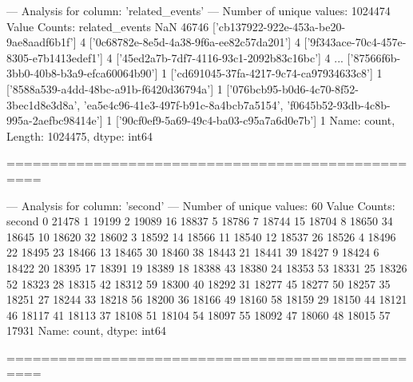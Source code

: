 --- Analysis for column: 'related_events' ---
Number of unique values: 1024474
Value Counts:
related_events
NaN                                                                                                                         46746
['cb137922-922e-453a-be20-9ae8aadf6b1f']                                                                                        4
['0c68782e-8e5d-4a38-9f6a-ee82c57da201']                                                                                        4
['9f343ace-70c4-457e-8305-e7b1413edef1']                                                                                        4
['45ed2a7b-7df7-4116-93c1-2092b83c16bc']                                                                                        4
                                                                                                                            ...  
['87566f6b-3bb0-40b8-b3a9-efca60064b90']                                                                                        1
['cd691045-37fa-4217-9c74-ca97934633c8']                                                                                        1
['8588a539-a4dd-48bc-a91b-f6420d36794a']                                                                                        1
['076bcb95-b0d6-4c70-8f52-3bec1d8e3d8a', 'ea5e4c96-41e3-497f-b91c-8a4bcb7a5154', 'f0645b52-93db-4c8b-995a-2aefbc98414e']        1
['90cf0ef9-5a69-49c4-ba03-c95a7a6d0e7b']                                                                                        1
Name: count, Length: 1024475, dtype: int64

==================================================

--- Analysis for column: 'second' ---
Number of unique values: 60
Value Counts:
second
0     21478
1     19199
2     19089
16    18837
5     18786
7     18744
15    18704
8     18650
34    18645
10    18620
32    18602
3     18592
14    18566
11    18540
12    18537
26    18526
4     18496
22    18495
23    18466
13    18465
30    18460
38    18443
21    18441
39    18427
9     18424
6     18422
20    18395
17    18391
19    18389
18    18388
43    18380
24    18353
53    18331
25    18326
52    18323
28    18315
42    18312
59    18300
40    18292
31    18277
45    18277
50    18257
35    18251
27    18244
33    18218
56    18200
36    18166
49    18160
58    18159
29    18150
44    18121
46    18117
41    18113
37    18108
51    18104
54    18097
55    18092
47    18060
48    18015
57    17931
Name: count, dtype: int64

==================================================

